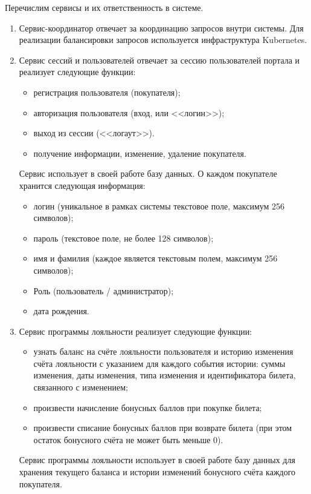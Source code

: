 Перечислим сервисы и их ответственность в системе.
\begin{enumerate}
    \item Сервис-координатор отвечает за координацию запросов внутри системы. Для реализации балансировки запросов используется инфраструктура Kubernetes.
    \item Сервис сессий и пользователей отвечает за сессию пользователей портала и реализует следующие функции:
    \begin{itemize}
        \item регистрация пользователя (покупателя); 
        \item авторизация пользователя (вход, или <<логин>>);
        \item выход из сессии (<<логаут>>).
        \item получение информации, изменение, удаление покупателя.
    \end{itemize}
    
    Сервис использует в своей работе базу данных. О каждом покупателе хранится следующая информация:
    \begin{itemize}
        \item логин (уникальное в рамках системы текстовое поле, максимум 256 символов);
        \item пароль (текстовое поле, не более 128 символов);
        \item имя и фамилия (каждое является текстовым полем, максимум 256 символов);
        \item Роль (пользователь / администратор);
        \item дата рождения.
    \end{itemize}
    \item Сервис программы лояльности реализует следующие функции:
    \begin{itemize}
        \item узнать баланс на счёте лояльности пользователя и историю изменения счёта лояльности с указанием для каждого события истории: суммы изменения, даты изменения, типа изменения и идентификатора билета, связанного с изменением; 
        \item произвести начисление бонусных баллов при покупке билета; 
        \item произвести списание бонусных баллов при возврате билета (при этом остаток бонусного счёта не может быть меньше 0).
    \end{itemize}

    Сервис программы лояльности использует в своей работе базу данных для хранения текущего баланса и истории изменений бонусного счёта каждого покупателя.


\end{enumerate}
